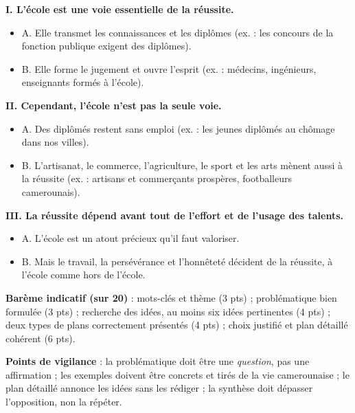 \documentclass[11pt]{article}
\begin{document}
\begin{corrige}
\begin{enumerate}
\textbf{I. L'école est une voie essentielle de la réussite.}
\begin{itemize}
\item A. Elle transmet les connaissances et les diplômes (ex. : les concours de la fonction publique exigent des diplômes).
\item B. Elle forme le jugement et ouvre l'esprit (ex. : médecins, ingénieurs, enseignants formés à l'école).
\end{itemize}
\textbf{II. Cependant, l'école n'est pas la seule voie.}
\begin{itemize}
\item A. Des diplômés restent sans emploi (ex. : les jeunes diplômés au chômage dans nos villes).
\item B. L'artisanat, le commerce, l'agriculture, le sport et les arts mènent aussi à la réussite (ex. : artisans et commerçants prospères, footballeurs camerounais).
\end{itemize}
\textbf{III. La réussite dépend avant tout de l'effort et de l'usage des talents.}
\begin{itemize}
\item A. L'école est un atout précieux qu'il faut valoriser.
\item B. Mais le travail, la persévérance et l'honnêteté décident de la réussite, à l'école comme hors de l'école.
\end{itemize}
\end{enumerate}

\textbf{Barème indicatif (sur 20)} : mots-clés et thème (3 pts) ; problématique bien formulée (3 pts) ; recherche des idées, au moins six idées pertinentes (4 pts) ; deux types de plans correctement présentés (4 pts) ; choix justifié et plan détaillé cohérent (6 pts).

\textbf{Points de vigilance} : la problématique doit être une \emph{question}, pas une affirmation ; les exemples doivent être concrets et tirés de la vie camerounaise ; le plan détaillé annonce les idées sans les rédiger ; la synthèse doit dépasser l'opposition, non la répéter.
\end{corrige}
\end{document}
